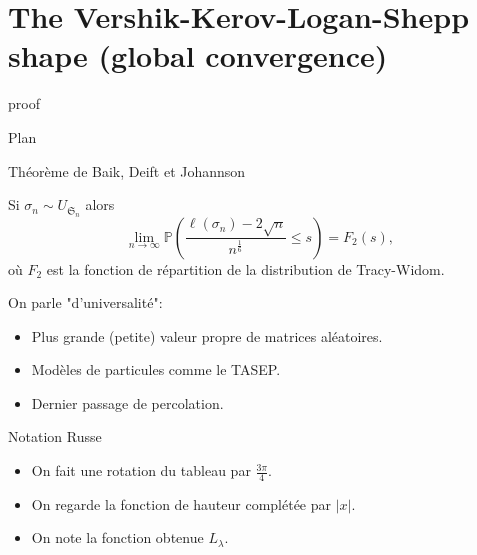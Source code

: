 \documentclass[english]{beamer}
\begin{document}
\section{The Vershik-Kerov-Logan-Shepp shape (global convergence)}
\begin{frame}{proof}

\end{frame}
\begin{frame}{Plan}
\tableofcontents[currentsection,currentsubsection,
    hideothersubsections, 
    sectionstyle=show/shaded,
]
\end{frame}

\begin{frame}{Théorème de Baik, Deift et Johannson}
    \begin{theorem} 
Si $\sigma_n \sim U_{\mathfrak{S}_n}$ alors
\begin{equation*} 
\lim_{n \to \infty} \mathbb{P}\left(\frac{\ell(\sigma_n)-2\sqrt{n}}{n^\frac 16}\leq s\right)=F_2(s),
\end{equation*}
o\`u  $F_2$ est la fonction de répartition de la distribution de Tracy-Widom.
\end{theorem}
\vspace{10 mm}

On parle "d'universalité":
\begin{itemize}
    \item Plus grande (petite) valeur propre de matrices aléatoires.
    \item Modèles de particules comme le TASEP.        \item Dernier passage de percolation.

\end{itemize}
\end{frame}

\begin{frame}{Notation Russe}
\begin{itemize}
    \item On fait une rotation du tableau par $\frac{3\pi}{4}$.
    \item On regarde la fonction de hauteur complétée par $|x|$.
    \item On note la fonction obtenue $L_\lambda$.
\end{itemize}
\end{frame}
\end{document}
